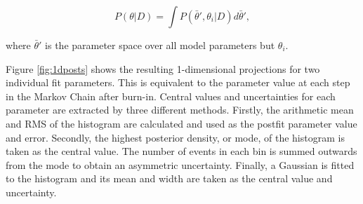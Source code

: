 \begin{equation}
P(\theta|D) = \int P(\bar{\theta}',\theta_i|D)d\bar{\theta}',
\end{equation}

where $\bar{\theta}'$ is the parameter space over all model parameters but $\theta_i$.

Figure \ref{fig:1dposts} shows the resulting 1-dimensional projections for two individual fit parameters. This is equivalent to the parameter value at each step in the Markov Chain after burn-in. Central values and uncertainties for each parameter are extracted by three different methods. Firstly, the arithmetic mean and RMS of the histogram are calculated and used as the postfit parameter value and error. Secondly, the highest posterior density, or mode, of the histogram is taken as the central value. The number of events in each bin is summed outwards from the mode to obtain an asymmetric uncertainty. Finally, a Gaussian is fitted to the histogram and its mean and width are taken as the central value and uncertainty.

